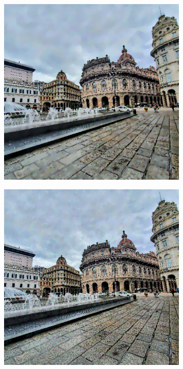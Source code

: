 \begin{figure}
\begin{minipage}{\textwidth}%
\begin{subfigure}{.3\textwidth}%
\includegraphics[width=\textwidth]{atelier/breg_cat/cat-50.png}%
%
\end{subfigure}\hfill%
\begin{subfigure}{.3\textwidth}%
\includegraphics[width=\textwidth]{atelier/breg_cat/cat-95.png}%

\end{subfigure}
\end{minipage}
\end{figure}
